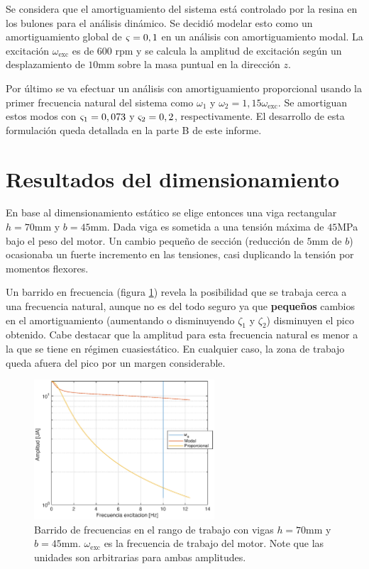 \documentclass[onecolumn,10pt,titlepage,a4paper]{article}
\begin{document}
Se considera que el amortiguamiento del sistema está controlado por la resina en los bulones para el análisis dinámico. Se decidió modelar esto como un amortiguamiento global de $\varsigma = 0,1$ en un análisis con amortiguamiento modal. La excitación $\omega_{\mathrm{exc}}$ es de 600 rpm y se calcula la amplitud de excitación según un desplazamiento de $10$mm sobre la masa puntual en la dirección $z$.

Por último se va efectuar un análisis con amortiguamiento proporcional usando la primer frecuencia natural del sistema como $\omega_1$ y $\omega_2 = 1,15 \omega_{\mathrm{exc}}$. Se amortiguan estos modos con $\varsigma_{1}=0,073$ y $\varsigma_2=0,2$, respectivamente. El desarrollo de esta formulación queda detallada en la parte B de este informe.

\section{Resultados del dimensionamiento}
En base al dimensionamiento estático se elige entonces una viga rectangular $h=70\si{\milli \meter}$ y $b=45\si{\milli \meter}$. Dada viga es sometida a una tensión máxima de $45$MPa bajo el peso del motor. Un cambio pequeño de sección (reducción de $5$mm de $b$) ocasionaba un fuerte incremento en las tensiones, casi duplicando la tensión por momentos flexores.

Un barrido en frecuencia (figura \ref{fig:sinesweepA}) revela la posibilidad que se trabaja cerca a una frecuencia natural, aunque no es del todo seguro ya que \textbf{pequeños} cambios en el amortiguamiento (aumentando o disminuyendo $\zeta_1$ y $\zeta_2$) disminuyen el pico obtenido. Cabe destacar que la amplitud para esta frecuencia natural es menor a la que se tiene en régimen cuasiestático. En cualquier caso, la zona de trabajo queda afuera del pico por un margen considerable.




\begin{figure}[htb!]
	\centering
	\includegraphics[width=0.6\textwidth]{fig/sinesweep.eps}
	\caption{Barrido de frecuencias en el rango de trabajo con vigas $h=70$mm y $b=45$mm. $\omega_{\mathrm{exc}}$ es la frecuencia de trabajo del motor. Note que las unidades son arbitrarias para ambas amplitudes.}
	\label{fig:sinesweepA}
\end{figure}
\end{document}
